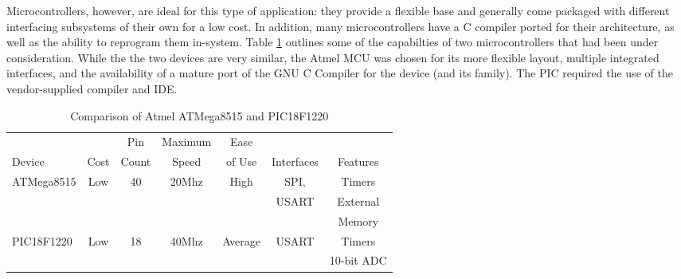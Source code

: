 Microcontrollers, however, are ideal for this type of application: they provide a flexible base and 
generally come packaged with different interfacing subsystems of their own for a low cost. In addition, 
many microcontrollers have a C compiler ported for their architecture, as well as the ability to 
reprogram them in-system. Table \ref{tab:MCU capabilities} outlines some of the capabilties of 
two microcontrollers that had been under consideration. While the the two devices are very similar, 
the Atmel MCU was chosen for its more flexible layout, multiple integrated interfaces, and the 
availability of a mature port of the GNU C Compiler for the device (and its family). The PIC required
the use of the vendor-supplied compiler and IDE.
\begin{table}[bhp]
\caption[Atmel and PIC MCUs]{Comparison of Atmel ATMega8515 and PIC18F1220}
\begin{tabular}{l| c c c c c c}
\setlength{\tabcolsep}{1pt}
	       &      & \small{Pin}  & \small{Maximum} & \small{Ease}   &            &         \\
	\small{Device} & \small{Cost} & \small{Count} & \small{Speed}  & \small{of Use} 
	& \small{Interfaces} & \small{Features}\\\hline
	\multirow{3}{*}{\small{ATMega8515}} & \multirow{3}{*}{\small{Low}} & \multirow{3}{*}{\small{40}}
	& \multirow{3}{*}{\small{20Mhz}} & \small{High} 
	& \small{SPI,} & \small{Timers}\\
	           &     &    &       &      &\small{USART} & \small{External}\\
	& & & & & &\small{Memory}\\\hline
	\small{PIC18F1220} & \small{Low} & \small{18} & \small{40Mhz} & \small{Average} & 
	\small{USART} & \small{Timers} \\
	           &     &    &       &      &  & \small{10-bit ADC}\\
\end{tabular}
\label{tab:MCU capabilities}
\end{table}


